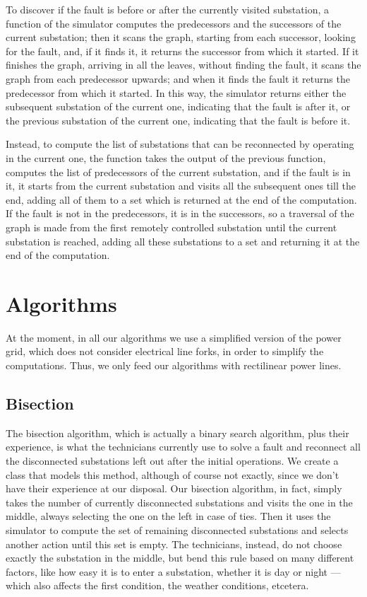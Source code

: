 To discover if the fault is before or after the currently visited substation, a function of the simulator computes the predecessors and the successors of the current substation; then it scans the graph, starting from each successor, looking for the fault, and, if it finds it, it returns the successor from which it started. If it finishes the graph, arriving in all the leaves, without finding the fault, it scans the graph from each predecessor upwards; and when it finds the fault it returns the predecessor from which it started. In this way, the simulator returns either the subsequent substation of the current one, indicating that the fault is after it, or the previous substation of the current one, indicating that the fault is before it.

Instead, to compute the list of substations that can be reconnected by operating in the current one, the function takes the output of the previous function, computes the list of predecessors of the current substation, and if the fault is in it, it starts from the current substation and visits all the subsequent ones till the end, adding all of them to a set which is returned at the end of the computation. If the fault is not in the predecessors, it is in the successors, so a traversal of the graph is made from the first remotely controlled substation until the current substation is reached, adding all these substations to a set and returning it at the end of the computation.


\section{Algorithms}


At the moment, in all our algorithms we use a simplified version of the power grid, which does not consider electrical line forks, in order to simplify the computations. Thus, we only feed our algorithms with rectilinear power lines.


\subsection{Bisection}

The bisection algorithm, which is actually a binary search algorithm, plus their experience, is what the technicians currently use to solve a fault and reconnect all the disconnected substations left out after the initial operations. We create a class that models this method, although of course not exactly, since we don't have their experience at our disposal. Our bisection algorithm, in fact, simply takes the number of currently disconnected substations and visits the one in the middle, always selecting the one on the left in case of ties. Then it uses the simulator to compute the set of remaining disconnected substations and selects another action until this set is empty. The technicians, instead, do not choose exactly the substation in the middle, but bend this rule based on many different factors, like how easy it is to enter a substation, whether it is day or night --- which also affects the first condition, the weather conditions, etcetera.


